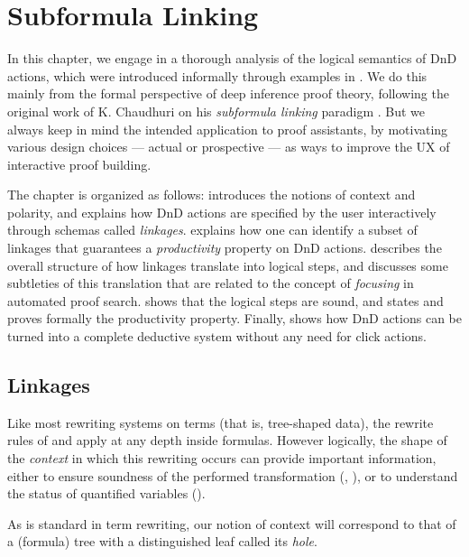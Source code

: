\setchapterpreamble[u]{\margintoc}
\chapter{Subformula Linking}

In this chapter, we engage in a thorough analysis of the logical semantics of
DnD actions, which were introduced informally through examples in .
We do this mainly from the formal perspective of deep inference proof theory,
following the original work of K. Chaudhuri on his \emph{subformula linking}
paradigm \cite{Chaudhuri2013}. But we always keep in mind the intended
application to proof assistants, by motivating various design choices --- actual
or prospective --- as ways to improve the UX of interactive proof building.

The chapter is organized as follows:  introduces the notions of
context and polarity, and explains how DnD actions are specified by the user
interactively through schemas called \emph{linkages}.  explains
how one can identify a subset of linkages that guarantees a \emph{productivity}
property on DnD actions.  describes the overall structure of how
linkages translate into logical steps, and  discusses some
subtleties of this translation that are related to the concept of
\emph{focusing} in automated proof search.  shows that the
logical steps are sound, and  states and proves formally
the productivity property. Finally,  shows how DnD
actions can be turned into a complete deductive system without any need for
click actions.

\section{Linkages}

Like most rewriting systems on terms (that is, tree-shaped data), the rewrite
rules of  and  apply at any depth inside formulas.
However logically, the shape of the \emph{context} in which this rewriting
occurs can provide important information, either to ensure soundness of the
performed transformation (, ), or 
to understand the status of quantified variables ().

As is standard in term rewriting, our notion of context will correspond to that
of a (formula) tree with a distinguished leaf called its
\emph{hole}.

